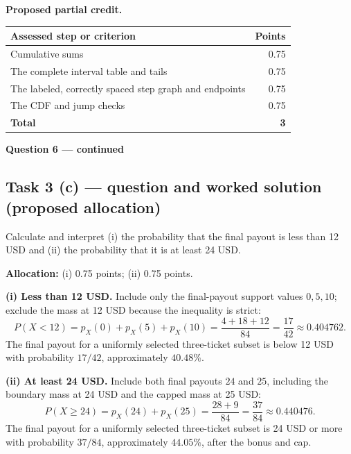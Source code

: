 \par\smallskip
\noindent\begin{minipage}{\linewidth}
\textbf{Proposed partial credit.}\par\smallskip
\begin{tabularx}{\linewidth}{@{}>{\raggedright\arraybackslash}X r@{}}\toprule
\textbf{Assessed step or criterion} & \textbf{Points}\\\midrule
Cumulative sums & 0.75\\
The complete interval table and tails & 0.75\\
The labeled, correctly spaced step graph and endpoints & 0.75\\
The CDF and jump checks & 0.75\\
\midrule
\textbf{Total} & \textbf{3}\\
\bottomrule\end{tabularx}
\end{minipage}\par\smallskip

\par\vspace{3mm}\secInicio[][sec:q6]

\clearpage
\textbf{Question 6 --- continued}

\subsection*{Task 3 (c) --- question and worked solution (proposed allocation) }
\label{sol:q6t3}

Calculate and interpret (i) the probability that the final payout is less than 12 USD and (ii) the probability that it is at least 24 USD.

\textbf{Allocation:} (i) 0.75 points; (ii) 0.75 points.

\textbf{(i) Less than 12 USD.} Include only the final-payout support values $0,5,10$; exclude the mass at 12 USD because the inequality is strict:
\[
P(X<12)=p_X(0)+p_X(5)+p_X(10)
=\frac{4+18+12}{84}=\frac{17}{42}\approx0.404762.
\]
The final payout for a uniformly selected three-ticket subset is below 12 USD with probability $17/42$, approximately $40.48\%$.

\textbf{(ii) At least 24 USD.} Include both final payouts $24$ and $25$, including the boundary mass at 24 USD and the capped mass at 25 USD:
\[
P(X\geq24)=p_X(24)+p_X(25)
=\frac{28+9}{84}=\frac{37}{84}\approx0.440476.
\]
The final payout for a uniformly selected three-ticket subset is 24 USD or more with probability $37/84$, approximately $44.05\%$, after the bonus and cap.

